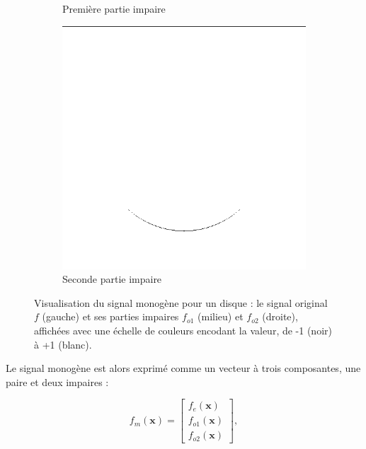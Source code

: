 \begin{figure}
\begin{subfigure}[b]{.3\textwidth}
        \caption{Première partie impaire}
    \end{subfigure}
    \hfill
    \begin{subfigure}[b]{.3\textwidth}
        \includegraphics[width=\textwidth]{contenu/resources/images/r1_disk}
        \caption{Seconde partie impaire}
    \end{subfigure}
    \caption[Visualisation du signal monogène pour un disque]{Visualisation du signal monogène pour un disque : le signal original $f$ (gauche) et ses parties impaires $f_{o1}$ (milieu) et  $f_{o2}$ (droite), affichées avec une échelle de couleurs encodant la valeur, de -1 (noir) à +1 (blanc).}
    \label{fig:monogenic-signal-disk}
\end{figure}

Le signal monogène est alors exprimé comme un vecteur à trois composantes, une paire et deux impaires :

\begin{equation}
    f_m(\mathbf{x}) =
    \left[
        \begin{array}{c}
        f_e(\mathbf{x}) \\
        f_{o1}(\mathbf{x}) \\
        f_{o2}(\mathbf{x})
        \end{array}
    \right],
\end{equation}

